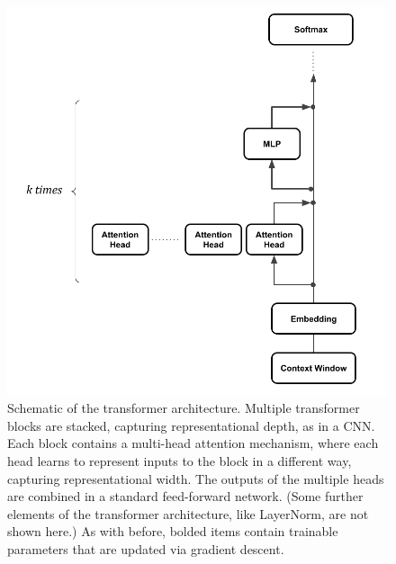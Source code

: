 \begin{figure}[ht]
\centering
\includegraphics[scale=.35]{./images/transformerBlockMultiHeadResidualStream.png}
\caption[Jeff Yoshimi with consultation from Tim Meyer.]{Schematic of the
transformer architecture. Multiple transformer blocks are stacked, capturing
representational depth, as in a CNN. Each block contains a multi-head attention
mechanism, where each head learns to represent inputs to the block in a
different way, capturing representational width. The outputs of the multiple
heads are combined in a standard feed-forward network. (Some further elements
of the transformer architecture, like LayerNorm, are not shown here.) As with
before, bolded items contain trainable parameters that are updated via gradient
descent.}
\label{multipleHeads}
\end{figure}
 
